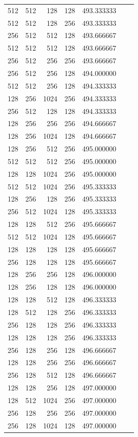 \documentclass{article}
\begin{document}
{\begin{longtable}{rrrrrrr}
512 & 512 & 128 & 128 & 493.333333 \\
512 & 512 & 128 & 256 & 493.333333 \\
256 & 512 & 512 & 128 & 493.666667 \\
512 & 512 & 512 & 128 & 493.666667 \\
256 & 512 & 256 & 256 & 493.666667 \\
256 & 512 & 256 & 128 & 494.000000 \\
512 & 512 & 256 & 128 & 494.333333 \\
128 & 256 & 1024 & 256 & 494.333333 \\
256 & 512 & 128 & 128 & 494.333333 \\
128 & 256 & 256 & 256 & 494.666667 \\
128 & 256 & 1024 & 128 & 494.666667 \\
128 & 256 & 512 & 256 & 495.000000 \\
512 & 512 & 512 & 256 & 495.000000 \\
128 & 128 & 1024 & 256 & 495.000000 \\
512 & 512 & 1024 & 256 & 495.333333 \\
128 & 256 & 128 & 256 & 495.333333 \\
256 & 512 & 1024 & 128 & 495.333333 \\
128 & 128 & 512 & 256 & 495.666667 \\
512 & 512 & 1024 & 128 & 495.666667 \\
128 & 128 & 128 & 128 & 495.666667 \\
256 & 128 & 128 & 128 & 495.666667 \\
128 & 256 & 256 & 128 & 496.000000 \\
128 & 256 & 128 & 128 & 496.000000 \\
128 & 128 & 512 & 128 & 496.333333 \\
128 & 512 & 128 & 256 & 496.333333 \\
256 & 128 & 128 & 256 & 496.333333 \\
128 & 128 & 128 & 256 & 496.333333 \\
256 & 128 & 256 & 128 & 496.666667 \\
128 & 128 & 256 & 256 & 496.666667 \\
256 & 128 & 512 & 128 & 496.666667 \\
128 & 128 & 256 & 128 & 497.000000 \\
128 & 512 & 1024 & 256 & 497.000000 \\
256 & 128 & 256 & 256 & 497.000000 \\
256 & 128 & 1024 & 128 & 497.000000 \\

\end{longtable}}
\end{document}
